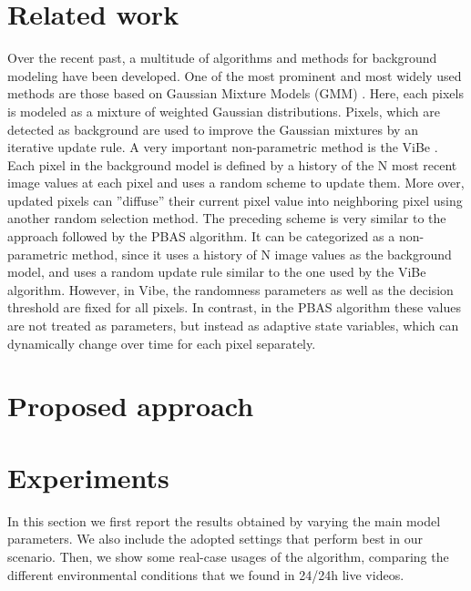 \section*{Related work}
Over the recent past, a multitude of algorithms and methods for background modeling have been developed.
One of the most prominent and most widely used methods are those based on Gaussian Mixture Models (GMM)
\cite{gmm}. Here, each pixels is modeled as a mixture of weighted Gaussian distributions. Pixels, which
are detected as background are used to improve the Gaussian mixtures by an iterative update rule. A very
important non-parametric method is the ViBe \cite{vibe}. Each pixel in the background model is defined by
a history of the N most recent image values at each pixel and uses a random scheme to update them.
More over, updated pixels can ”diffuse” their current pixel value into neighboring pixel using another
random selection method. The preceding scheme is very similar to the approach followed by the PBAS algorithm.
It can be categorized as a non-parametric method, since it uses a history of N image values as the background
model, and uses a random update rule similar to the one used by the ViBe algorithm. However, in Vibe, the
randomness parameters as well as the decision threshold are fixed for all pixels. In contrast, in the PBAS
algorithm these values are not treated as parameters, but instead as adaptive state variables, which can
dynamically change over time for each pixel separately.


\section*{Proposed approach}


\section*{Experiments}
In this section we first report the results obtained by varying the main model parameters. We also include the
adopted settings that perform best in our scenario. Then, we show some real-case usages of the algorithm,
comparing the different environmental conditions that we found in 24/24h live videos.

